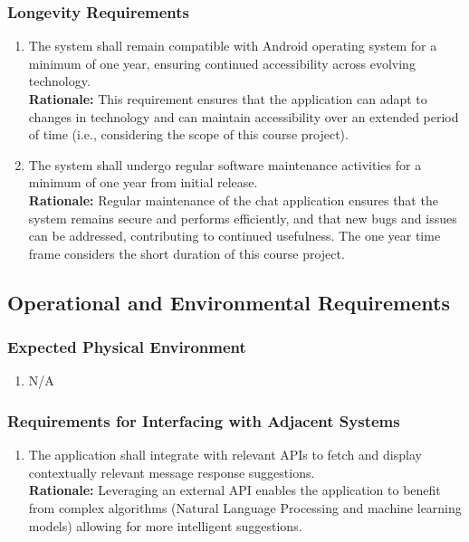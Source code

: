 \documentclass[]{article}
\begin{document}
\subsubsection{Longevity Requirements}
\label{ssub:longevity_requirements}
\begin{enumerate}[{PR-L}1. ]
    \item The system shall remain compatible with Android operating system for a minimum of one year, ensuring continued 
    accessibility across evolving technology. \\
    {\bf Rationale:} This requirement ensures that the application can adapt to changes in technology and can maintain
    accessibility over an extended period of time (i.e., considering the scope of this course project).
    \item The system shall undergo regular software maintenance activities for a minimum of one year from initial release. \\
    {\bf Rationale:} Regular maintenance of the chat application ensures that the system remains secure and performs efficiently, and
    that new bugs and issues can be addressed, contributing to continued usefulness. The one year time frame considers the short duration 
    of this course project.
\end{enumerate}


\subsection{Operational and Environmental Requirements}
\label{sub:operational_and_environmental_requirements}
\subsubsection{Expected Physical Environment}
\label{ssub:expected_physical_environment}
\begin{enumerate}[{OE-EPE}1. ]
    \item N/A
\end{enumerate}
\subsubsection{Requirements for Interfacing with Adjacent Systems}
\label{ssub:requirements_for_interfacing_with_adjacent_systems}
\begin{enumerate}[{OE-IA}1. ]
    \item The application shall integrate with relevant APIs to fetch and display contextually relevant message response suggestions.\\
    {\bf Rationale:} Leveraging an external API enables the application to benefit from complex algorithms (Natural Language Processing and 
    machine learning models) allowing for more intelligent suggestions.
\end{enumerate} 
\end{document}
